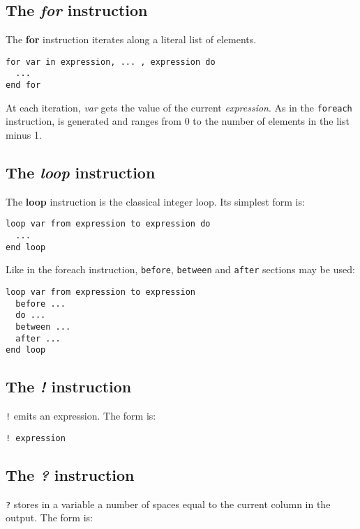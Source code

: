 \subsection{The {\em for} instruction}

The {\bf for} instruction iterates along a literal list of elements.

\begin{lstlisting}
for var in expression, ... , expression do
  ...
end for
\end{lstlisting}

At each iteration, {\em var} gets the value of the current {\em expression}. As in the {\tt foreach} instruction,  is generated and ranges from 0 to the number of elements in the list minus 1.

\subsection{The {\em loop} instruction}

The {\bf loop} instruction is the classical integer loop. Its simplest form is:

\begin{lstlisting}
loop var from expression to expression do
  ...
end loop
\end{lstlisting}

Like in the foreach instruction, {\tt before},  {\tt between} and  {\tt after} sections may be used:

\begin{lstlisting}
loop var from expression to expression
  before ...
  do ...
  between ...
  after ...
end loop
\end{lstlisting}


\subsection{The {\em !} instruction}
\label{outputInstruction}

{\tt !} emits an expression. The form is:

\begin{lstlisting}
! expression
\end{lstlisting}

\subsection{The {\em ?} instruction}

{\tt ?} stores in a variable a number of spaces equal to the current column in the output. The form is:

